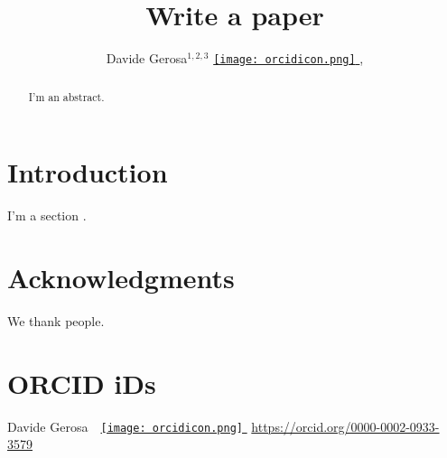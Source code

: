 \documentclass[]{iopart}
\newcommand\orcid[1]{\href{https://orcid.org/#1}{$\!\!$\texttt{[image: orcidicon.png]} $\!\!$}}
\newcommand{\bham}{{School of Physics and Astronomy \& Institute for Gravitational Wave Astronomy, University of Birmingham, Birmingham, B15 2TT, UK}}
\newcommand{\milan}{{Dipartimento di Fisica ``G. Occhialini'', Universit\'a degli Studi di Milano-Bicocca, Piazza della Scienza 3, 20126 Milano, Italy}}
\newcommand{\infn}{{INFN, Sezione di Milano-Bicocca, Piazza della Scienza 3, 20126 Milano, Italy}}
\begin{document}
\begin{center}
\title[Write a paper]{Write a paper}
\end{center}


\author{
Davide Gerosa$^{1,2,3}$ \orcid{0000-0002-0933-3579},\\
}
\vspace{0.1cm}
\address{$^{1}$~\milan}
\address{$^{2}$~\infn}
\address{$^{3}$~\bham}
\setcounter{footnote}{0}





\begin{abstract}
I'm an abstract. \lipsum[1]
\end{abstract}


\section{Introduction}

I'm a section \cite{2016PhRvL.116f1102A}. \lipsum[2-3]



\section*{Acknowledgments}

We thank people. \lipsum[4]

\section*{ORCID iDs}
Davide Gerosa~~\orcid{0000-0002-0933-3579} \href{https://orcid.org/0000-0002-0933-3579}{https://orcid.org/0000-0002-0933-3579} \\


{\small
\setlength{\bibsep}{0.005cm}


}
\end{document}
